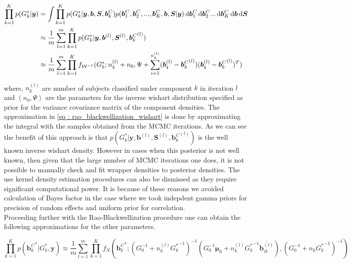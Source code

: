 \begin{equation}
\label{eq : rao_blackwellization_wishart}
\begin{split}
\prod_{k=1}^K p(G_k^*|\boldsymbol{y}) & = \int \prod_{k=1}^{K} p(G_k^*| \boldsymbol{y}, \boldsymbol{b}, \boldsymbol{S}, \boldsymbol{b}_k^C) p(\boldsymbol{b}_1^C, \boldsymbol{b}_2^C,..., \boldsymbol{b}_K^C,\boldsymbol{b}, \boldsymbol{S}|\boldsymbol{y}) 
\mathop{}\!\mathrm{d}{\boldsymbol{b}_1^C} \mathop{}\!\mathrm{d}{\boldsymbol{b}_2^C} ... \mathop{}\!\mathrm{d}{\boldsymbol{b}_K^C} \mathop{}\!\mathrm{d}{\boldsymbol{b}} \mathop{}\!\mathrm{d}{\boldsymbol{S}}\\
& \approx \frac 1 m \sum_{l=1}^m \prod_{k=1}^{K} p(G_k^*| \boldsymbol{y}, \boldsymbol{b}^{(l)}, \boldsymbol{S}^{(l)}, {\boldsymbol{b}_k^C}^{(l)
})\\
& \approx \frac 1 m \sum_{l=1}^m \prod_{k=1}^{K} f_{\mathcal{W}^{-1}}(G_k^*; n_k^{(l)}+n_0, \Psi + \sum_{i=1}^{n_k^{(l)}}(\boldsymbol{b_i}^{(l)} - {\boldsymbol{b}_k^C}^{(l)})(\boldsymbol{b_i}^{(l)} - {\boldsymbol{b}_k^C}^{(l)})^T)
\end{split}
\end{equation}

where, $n_k^{(l)}$ are number of subjects classified under component $k$ in iteration $l$ and $(n_0, \Psi)$ are the parameters for the inverse wishart distribution specified as prior for the variance covariance matrix of the component densities. The approximation in \ref{eq : rao_blackwellization_wishart} is done by approximating the integral with the samples obtained from the MCMC iterations. As we can see the benefit of this approach is that $p(G_k^*| \boldsymbol{y}, \boldsymbol{b}^{(l)}, \boldsymbol{S}^{(l)}, {\boldsymbol{b}_k^C}^{(l)})$ is the well known inverse wishart density. However in cases when this posterior is not well known, then given that the large number of MCMC iterations one does, it is not possible to manually check and fit wrapper densities to posterior densities. The use kernel density estimation procedures can also be dismissed as they require significant computational power. It is because of these reasons we avoided calculation of Bayes factor in the case where we took indepdent gamma priors for precision of random effects and uniform prior for correlation.\\

Proceeding further with the Rao-Blackwellization procedure one can obtain the following approximations for the other parameters.

\begin{equation}
\prod_{k=1}^K p({\boldsymbol{b}_k^C}^*|G_k^*, \boldsymbol{y}) \approx 
\frac 1 m \sum_{l=1}^m \prod_{k=1}^{K} f_N({\boldsymbol{b}_k^C}^*; (G_0^{-1} + n_k^{(l)} {G_k^*}^{-1})^{-1} (G_0^{-1}\boldsymbol{\mu}_0 + n_k^{(l)} {G_k^*}^{-1} \bar{\boldsymbol{b}_{ik}^{(l)}}) , (G_0^{-1} + n_k {G_k^*}^{-1})^{-1})
\end{equation}


